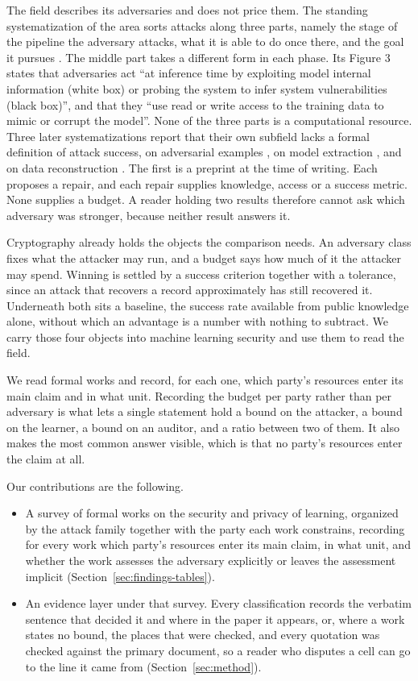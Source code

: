 The field describes its adversaries and does not price them. The standing systematization of the area sorts attacks along
three parts, namely the stage of the pipeline the adversary attacks, what it is able
to do once there, and the goal it pursues \cite{PMSW18}. The middle part takes a
different form in each phase. Its Figure 3 states that adversaries act ``at
inference time by exploiting model internal information (white box) or probing the
system to infer system vulnerabilities (black box)'', and that they ``use read or
write access to the training data to mimic or corrupt the model''. None of the three
parts is a computational resource. Three later systematizations report that their own subfield lacks a formal definition of attack
success, on adversarial examples \cite{FK24}, on model extraction \cite{SSEP24},
and on data reconstruction \cite{WLBZ25}. The first is a preprint at the time of
writing. Each proposes a repair, and each repair supplies knowledge, access
or a success metric. None supplies a budget. A reader holding two results therefore
cannot ask which adversary was stronger, because neither result answers it.

Cryptography already holds the objects the comparison needs. An adversary class
fixes what the attacker may run, and a budget says how much of it the attacker may
spend. Winning is settled by a success criterion together with a tolerance, since
an attack that recovers a record approximately has still recovered it. Underneath
both sits a baseline, the success rate available from public knowledge alone,
without which an advantage is a number with nothing to subtract. We carry those
four objects into machine learning security and use them to read the field.

We read \NumSources{} formal works and record, for each one, which party's
resources enter its main claim and in what unit. Recording the budget per party
rather than per adversary is what lets a single statement hold a bound on the
attacker, a bound on the learner, a bound on an auditor, and a ratio between two of
them. It also makes the most common answer visible, which is that no party's
resources enter the claim at all.

Our contributions are the following.

\begin{itemize}
  \item A survey of \NumSources{} formal works on the security and privacy of
        learning, organized by the attack family together with the party each work
        constrains, recording for every work which party's resources enter its main
        claim, in what unit, and whether the work assesses the adversary explicitly
        or leaves the assessment implicit (Section~\ref{sec:findings-tables}).
  \item An evidence layer under that survey. Every classification records the
        verbatim sentence that decided it and where in the paper it appears, or,
        where a work states no bound, the places that were checked, and every
        quotation was checked against the primary document, so a reader who
        disputes a cell can go to the line it came from (Section~\ref{sec:method}).
\end{itemize}
